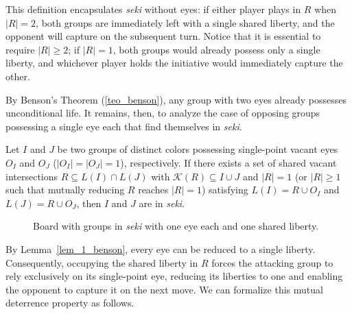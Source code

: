 This definition encapsulates \textit{seki} without eyes: if either player plays in $R$ when $|R| = 2$, both groups are immediately left with a single shared liberty, and the opponent will capture on the subsequent turn. Notice that it is essential to require $|R| \ge 2$; if $|R| = 1$, both groups would already possess only a single liberty, and whichever player holds the initiative would immediately capture the other.

By Benson's Theorem (\ref{teo_benson}), any group with two eyes already possesses unconditional life. It remains, then, to analyze the case of opposing groups possessing a single eye each that find themselves in \textit{seki}.

\begin{definition}\label{def:seki_one_eye}
	Let $I$ and $J$ be two groups of distinct colors possessing single-point vacant
	eyes $O_I$ and $O_J$ ($|O_I| = |O_J| = 1$), respectively. If there exists a set
	of shared vacant intersections $R \subseteq L(I) \cap L(J)$ with
	$\mathcal{K}(R) \subseteq I \cup J$ and $|R| = 1$ (or $|R| \ge 1$ such that
	mutually reducing $R$ reaches $|R| = 1$) satisfying $L(I) = R \cup O_I$ and
	$L(J) = R \cup O_J$, then $I$ and $J$ are in \emph{seki}.
\end{definition}

\begin{figure}[H]
	\centering
	\begin{goban}[7, hoshi = false]
	\end{goban}
	\caption{Board with groups in \textit{seki} with one \textcolor{sealred}{eye} each and one shared \textcolor{Moss}{liberty}.}
	\label{fig:sekiojos}
\end{figure}

By Lemma~\ref{lem_1_benson}, every eye can be reduced to a single liberty. Consequently, occupying the shared liberty in $R$ forces the attacking group to rely exclusively on its single-point eye, reducing its liberties to one and enabling the opponent to capture it on the next move. We can formalize this mutual deterrence property as follows.

